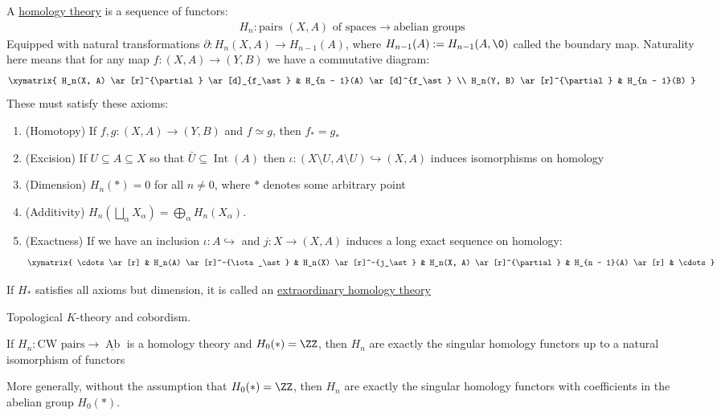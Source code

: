 \begin{defn}\label{defn-eilenberg-steenrod}
	A \ul{homology theory} is a sequence of functors:
	\begin{align*}
		H_n : \text{pairs } (X, A) \text{ of spaces} \to \text{abelian groups}
	\end{align*}
	Equipped with natural transformations $\partial : H_n(X, A) \to H_{n - 1}(A)$, where $H_{n - 1}(A) := H_{n - 1}(A, \0)$ called the boundary map. Naturality here means that for any map $f : (X, A) \to (Y, B)$ we have a commutative diagram:
	\begin{align*}
		\xymatrix{
		H_n(X, A) \ar[r]^{\partial} \ar[d]_{f_\ast} & H_{n - 1}(A) \ar[d]^{f_\ast} \\
		H_n(Y, B) \ar[r]^{\partial}                 & H_{n - 1}(B)
		}
	\end{align*}
	These must satisfy these axioms:
	\begin{enumerate}[(1)]
		\item (Homotopy) If $f, g : (X, A) \to (Y, B)$ and $f \simeq g$, then $f_\ast = g_\ast$
		\item (Excision) If $U \subseteq A \subseteq X$ so that $\bar{U} \subseteq \operatorname{Int} (A)$ then $\iota : (X \setminus U, A \setminus U) \hookrightarrow (X, A)$ induces isomorphisms on homology
		\item  (Dimension) $H_n(\ast) = 0$ for all $n \neq 0$, where $\ast$ denotes some arbitrary point
		\item (Additivity) $H_n\left(\bigsqcup_\alpha X_\alpha\right) = \bigoplus_\alpha H_n(X_\alpha)$.
		\item (Exactness) If we have an inclusion $\iota : A \hookrightarrow$ and $j : X \to (X, A)$ induces a long exact sequence on homology:
		      \begin{align*}
			      \xymatrix{
			      \cdots \ar[r] & H_n(A) \ar[r]^-{\iota_\ast} & H_n(X) \ar[r]^-{j_\ast} & H_n(X, A) \ar[r]^{\partial} & H_{n - 1}(A) \ar[r] & \cdots
			      }
		      \end{align*}
	\end{enumerate}
	If $H_\ast$ satisfies all axioms but dimension, it is called an \ul{extraordinary homology theory}
	\begin{example}
		Topological $K$-theory and cobordism.
	\end{example}
\end{defn}

\begin{theorem}\label{thm-characterization-of-singular-homology}
	If $H_n : \text{CW pairs} \to \underline{\operatorname{Ab}}$ is a homology theory and $H_0(\ast) = \ZZ$, then $H_n$ are exactly the singular homology functors up to a natural isomorphism of functors

	More generally, without the assumption that $H_0(\ast) = \ZZ$, then $H_n$ are exactly the singular homology functors with coefficients in the abelian group $H_0(\ast)$.
\end{theorem}

